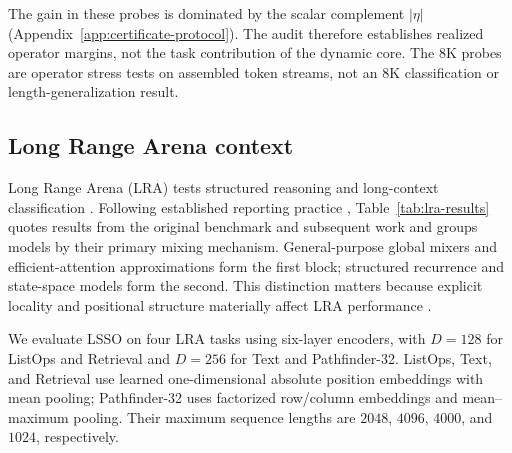 \documentclass[10pt]{article}
\begin{document}
The gain in these probes is dominated by the scalar complement $|\eta|$
(Appendix~\ref{app:certificate-protocol}).  The audit therefore establishes
realized operator margins, not the task contribution of the dynamic core.
The $8$K probes are operator stress tests on assembled token streams, not an
$8$K classification or length-generalization result.

\subsection{Long Range Arena context}

Long Range Arena (LRA) tests structured reasoning and long-context
classification \cite{tay2021lra}.  Following established reporting practice
\cite{gu2022s4}, Table~\ref{tab:lra-results} quotes results from the original
benchmark and subsequent work and groups models by their primary mixing
mechanism.  General-purpose global mixers and efficient-attention
approximations form the first block; structured recurrence and state-space
models form the second.  This distinction matters because explicit locality
and positional structure materially affect LRA performance
\cite{mirallesgonzalez2025locality}.

We evaluate LSSO on four LRA tasks using six-layer encoders, with $D=128$ for
ListOps and Retrieval and $D=256$ for Text and Pathfinder-32.  ListOps, Text,
and Retrieval use learned one-dimensional absolute position embeddings with
mean pooling; Pathfinder-32 uses factorized row/column embeddings and
mean--maximum pooling.  Their maximum sequence lengths are $2048$, $4096$,
$4000$, and $1024$, respectively.
\end{document}
